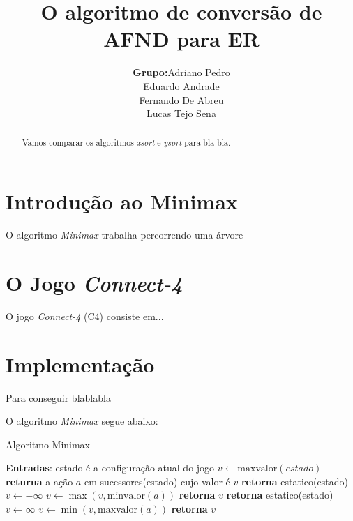 \documentclass[a4paper,10pt]{article} %
\title{O algoritmo de conversão de AFND para ER}
\author{
    \begin{tabular}{ll}
        \textbf{Grupo:} &
        Adriano Pedro \tabularnewline &
        Eduardo Andrade\tabularnewline &
        Fernando De Abreu\tabularnewline &
        Lucas Tejo Sena\tabularnewline
    \end{tabular}
}
\begin{document}
\maketitle

\begin{abstract}

Vamos comparar os algoritmos \textit{xsort} e \textit{ysort} para bla bla.

\end{abstract}


\section{Introdução ao Minimax}

O algoritmo \textit{Minimax} trabalha percorrendo uma árvore

\section{O Jogo \textit{Connect-4}}

O jogo \textit{Connect-4} (C4) consiste em...

\section{Implementação}

Para conseguir blablabla

O algoritmo \textit{Minimax} segue abaixo:

\begin{algorithm}
\caption{Algoritmo Minimax}\label{alg:minimax}
\begin{algorithmic}[1]
\State \textbf{Entradas}: estado é a configuração atual do jogo
\State $v\gets \mathrm{maxvalor}{(estado)}$
\State \textbf{returna} a ação $a$ em sucessores(estado) cujo valor é $v$ %
\EndFunction
{}
   \State \textbf{retorna} estatico(estado)
\EndIf
\State $v \gets -\infty$
    \State $v \gets \max{(v, \mathrm{minvalor}(a))}$
\EndFor
\State \textbf{retorna} $v$
\EndFunction
{}
   \State \textbf{retorna} estatico(estado)
\EndIf
\State $v \gets \infty$
    \State $v \gets \min{(v, \mathrm{maxvalor}(a))}$
\EndFor
\State \textbf{retorna} $v$
\EndFunction
\end{algorithmic}
\end{algorithm}
\end{document}
